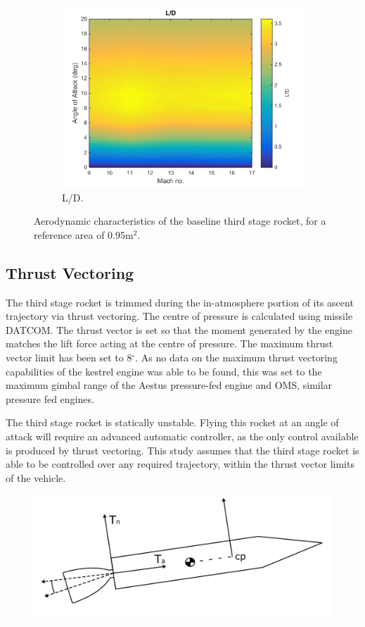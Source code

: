 \begin{figure}
\begin{subfigure}{.5\textwidth}
				\includegraphics[width=0.99\linewidth]{figures/3_vehicle_design/ThirdStageLD}
				\caption{L/D.}
				\label{fig:LD-ThirdStage}
			\end{subfigure}
			\caption{Aerodynamic characteristics of the baseline third stage rocket, for a reference area of 0.95m$^2$.}
			\label{fig:ThirdStageAero}
		\end{figure}
		
		
		
		\subsection{Thrust Vectoring}
		
		The third stage rocket is trimmed during the in-atmosphere portion of its ascent trajectory via thrust vectoring. The centre of pressure is calculated using missile DATCOM. The thrust vector is set so that the moment generated by the engine matches the lift force acting at the centre of pressure. The maximum thrust vector limit has been set to 8$^\circ$. As no data on the maximum thrust vectoring capabilities of the kestrel engine was able to be found, this was set to the maximum gimbal range of the Aestus pressure-fed engine and OMS, similar pressure fed engines.
		
		The third stage rocket is statically unstable. Flying this rocket at an angle of attack will require an advanced automatic controller, as the only control available is produced by thrust vectoring. This study assumes that the third stage rocket is able to be controlled over any required trajectory, within the thrust vector limits of the vehicle. 
		
		
\begin{figure}
\centering
\includegraphics[width=0.6\linewidth]{figures/3_vehicle_design/ThrustVec}
\caption{}
\label{fig:ThrustVec}
\end{figure}
		

		